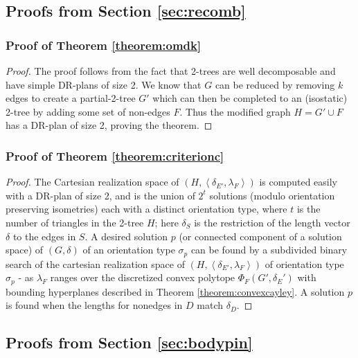 \subsection{Proofs from Section \ref{sec:recomb}}

\subsubsection{Proof of Theorem \ref{theorem:omdk}}
\begin{proof}
The proof follows from the fact that 2-trees are well decomposable and
have simple DR-plans of size 2. We know that $G$ can be reduced by
removing $k$ edges to create a partial-2-tree $G'$ which can then be
completed to an (isostatic) 2-tree by adding some set of non-edges
$F$. Thus the modified graph $H = G'\cup F$ has  a DR-plan of size 2,
proving the theorem.
\end{proof}

\subsubsection{Proof of Theorem \ref{theorem:criterionc}}
\begin{proof}
    The Cartesian realization space of $(H,\left<\delta_{E'},
    \lambda_F\right>)$ is computed easily with a DR-plan of size 2,
    and is the union of $2^t$ solutions (modulo orientation preserving
    isometries) each with a distinct orientation type, where $t$ is
    the number of triangles in the 2-tree $H$; here $\delta_{S}$ is
    the restriction of the length vector $\delta$ to the edges in $S$.
    A desired solution $p$ (or connected component of a solution
    space) of $(G,\delta)$ of an orientation type $\sigma_p$ can be
    found by a subdivided binary search   of the cartesian realization
    space of $(H, \left<\delta_{E'}, \lambda_F\right>)$ of orientation
    type $\sigma_p$ - as $\lambda_F$ ranges over the discretized
    convex polytope $\Phi_F(G',\delta_E')$ with bounding hyperplanes
    described in Theorem \ref{theorem:convexcayley}. A solution $p$
    is found  when the lengths for nonedges in $D$ match $\delta_D$.
\end{proof}


\subsection{Proofs from Section \ref{sec:bodypin}}

